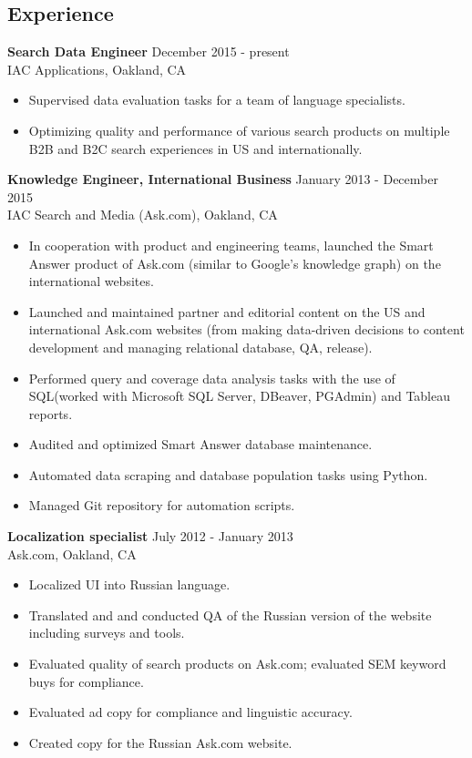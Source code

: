 \documentclass[10pt,line,letterpaper]{res}
\begin{document}
\address{2024 Vine St Apt 2D, Berkeley, CA}
\address{sofya.mulenok@gmail.com or (415)-359-3454}

\begin{resume}
\pagestyle{empty}
\section{Experience}
    {\bf Search Data Engineer} \hfill December 2015 - present \\
    IAC Applications, Oakland, CA
    \begin{itemize} \itemsep -2pt
    \item Supervised data evaluation tasks for a team of language specialists.
    \item Optimizing quality and performance of various search products on multiple B2B and B2C search experiences in US and internationally.
    \end{itemize}
    
    {\bf Knowledge Engineer, International Business} \hfill January 2013 - December 2015 \\
    IAC Search and Media (Ask.com), Oakland, CA
    \begin{itemize} \itemsep -2pt
    \item In cooperation with product and engineering teams, launched the Smart Answer product of Ask.com (similar to Google's knowledge graph) on the international websites.
    \item Launched and maintained partner and editorial content on the US and international Ask.com websites (from making data-driven decisions to content development and managing relational database, QA, release).
    \item Performed query and coverage data analysis tasks with the use of SQL(worked with Microsoft SQL Server, DBeaver, PGAdmin) and Tableau reports.
    \item Audited and optimized Smart Answer database maintenance.
    \item Automated data scraping and database population tasks using Python.
    \item Managed Git repository for automation scripts.
    \end{itemize}

    {\bf Localization specialist} \hfill July 2012 - January 2013 \\
    Ask.com, Oakland, CA
    \begin{itemize} \itemsep -2pt
    \item Localized UI into Russian language.
    \item Translated and and conducted QA of the Russian version of the website including surveys and tools.
    \item Evaluated quality of search products on Ask.com; evaluated SEM keyword buys for compliance.
    \item Evaluated ad copy for compliance and linguistic accuracy.
    \item Created copy for the Russian Ask.com website.


\end{itemize}
\end{resume}
\end{document}

